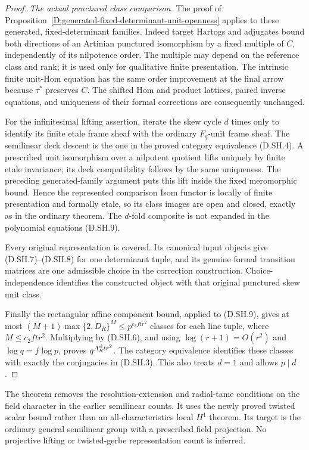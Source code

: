 \begin{proof}
\emph{The actual punctured class comparison.}
The proof of
Proposition~\ref{D:generated-fixed-determinant-unit-openness}
applies to these generated, fixed-determinant families.
Indeed target Hartogs and adjugates bound both directions
of an Artinian punctured isomorphism by a fixed multiple
of $C$, independently of its nilpotence order.
The multiple may depend on the reference class and rank;
it is used only for qualitative finite presentation.
The intrinsic finite unit-Hom equation has the same
order improvement at the final arrow because $\tau^*$
preserves $C$. The shifted Hom and product lattices,
paired inverse equations, and uniqueness of their formal
corrections are consequently unchanged.

For the infinitesimal lifting assertion, iterate the skew
cycle $d$ times only to identify its finite etale frame
sheaf with the ordinary $F_q$-unit frame sheaf. The
semilinear deck descent is the one in the proved category
equivalence (D.SH.4). A prescribed unit isomorphism over
a nilpotent quotient lifts uniquely by finite etale
invariance; its deck compatibility follows by the same
uniqueness. The preceding generated-family argument puts
this lift inside the fixed meromorphic bound. Hence the
represented comparison Isom functor is locally of finite
presentation and formally etale, so its class images are
open and closed, exactly as in the ordinary theorem.
The $d$-fold composite is not expanded in the polynomial
equations (D.SH.9).

Every original representation is covered. Its canonical
input objects give (D.SH.7)--(D.SH.8) for one determinant
tuple, and its genuine formal transition matrices are
one admissible choice in the correction construction.
Choice-independence identifies the constructed object
with that original punctured skew unit class.

Finally the rectangular affine component bound, applied
to (D.SH.9), gives at most
$(M+1)\max\{2,D_R\}^M\le p^{c_3ft r^2}$ classes for
each line tuple, where $M\le c_2ft r^2$.
Multiplying by (D.SH.6), and using
$\log(r+1)=O(r^2)$ and $\log q=f\log p$, proves
$q^{A_R^{\rm sl}tr^2}$.
The category equivalence identifies these classes with
exactly the conjugacies in (D.SH.3). This also treats
$d=1$ and allows $p\mid d$.
\end{proof}

\begin{remark}
The theorem removes the resolution-extension and radial-tame
conditions on the field character in the earlier semilinear
counts. It uses the newly proved twisted scalar bound rather
than an all-characteristics local $H^1$ theorem. Its target
is the ordinary general semilinear group with a prescribed
field projection. No projective lifting or twisted-gerbe
representation count is inferred.
\end{remark}
